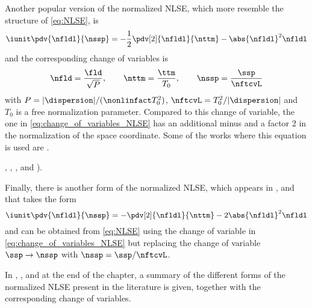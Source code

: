 Another popular version of the normalized \ac{NLSE}, which more resemble the
structure of \eqref{eq:NLSE}, is
\begin{equation}\label{eq:NLSE_normalized_agrawal}
    \iunit \pdv{\nfldl}{\nssp} = -\dfrac{1}{2}\pdv[2]{\nfldl}{\nttm}
                             - \abs{\nfldl}^2 \nfldl
\end{equation}
and the corresponding change of variables is
\begin{equation}\label{eq:change_of_variables_NLSE_Agrawal}
  \nfld = \dfrac{\fld}{\sqrt{P}},
  \hspace{0.7cm} \nttm = \dfrac{\ttm}{T_0},
  \hspace{0.7cm} \nssp = \dfrac{\ssp}{\nftcvL}
\end{equation}
with $P = |\dispersion|/(\nonlinfact T_0^2)$, $\nftcvL = T_0^2 /|\dispersion|$ and $T_0$ is a free normalization parameter. Compared to this change of variable,  the one in \eqref{eq:change_of_variables_NLSE} has an additional minus and a factor 2 in the normalization of the space coordinate.
Some of the works where this equation is used are
\cite{Agrawal12_NonlinearFOs_Book,hasegawa1995solitons,Hasegawa,
prilepsky2013nonlinear,desbruslais1996inverse}.
\begin{extendedthesis}
\cite[eq.~(5.2.5)]{Agrawal12_NonlinearFOs_Book},
\cite[eq.~(4.0.1)]{hasegawa1995solitons}, \cite[eq.~(5.27)]{Iannone98_Book}, and
\cite[eq.~(5)]{desbruslais1996inverse}).
\end{extendedthesis}

Finally, there is another form of the normalized \ac{NLSE}, which appears in \cite{ablowitz1974inverse,Yang10_Book,Buelow}, and that takes the form
\begin{equation}\label{eq:NLSE_normalized_yang}
    \iunit \pdv{\nfldl}{\nssp} = -\pdv[2]{\nfldl}{\nttm}
                             - 2 \abs{\nfldl}^2 \nfldl
\end{equation}
and can be obtained from \eqref{eq:NLSE} using the change of variable in \eqref{eq:change_of_variables_NLSE} but replacing the change of variable
$\ssp\rightarrow\nssp$ with $\nssp=\ssp/\nftcvL$.

In , , and 
at the end of the chapter, a summary of the different forms of
the normalized \ac{NLSE} present in the literature is given, together with the
corresponding change of variables.


